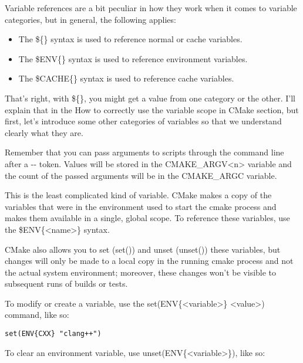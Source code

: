 Variable references are a bit peculiar in how they work when it comes to variable categories, but in general, the following applies:

\begin{itemize}
\item 
The \$\{\} syntax is used to reference normal or cache variables.

\item 
The \$ENV\{\} syntax is used to reference environment variables.

\item 
The \$CACHE\{\} syntax is used to reference cache variables.
\end{itemize}

That's right, with \$\{\}, you might get a value from one category or the other. I'll explain that in the How to correctly use the variable scope in CMake section, but first, let's introduce some other categories of variables so that we understand clearly what they are.

\begin{tcolorbox}[colback=blue!5!white,colframe=blue!75!black,title=Note]
Remember that you can pass arguments to scripts through the command line after a -{}- token. Values will be stored in the CMAKE\_ARGV<n> variable and the count of the passed arguments will be in the CMAKE\_ARGC variable.
\end{tcolorbox}


This is the least complicated kind of variable. CMake makes a copy of the variables that were in the environment used to start the cmake process and makes them available in a single, global scope. To reference these variables, use the \$ENV\{<name>\} syntax.

CMake also allows you to set (set()) and unset (unset()) these variables, but changes will only be made to a local copy in the running cmake process and not the actual system environment; moreover, these changes won't be visible to subsequent runs of builds or tests.

To modify or create a variable, use the set(ENV\{<variable>\} <value>) command, like so:

\begin{lstlisting}[style=styleCMake]
set(ENV{CXX} "clang++")
\end{lstlisting}

To clear an environment variable, use unset(ENV\{<variable>\}), like so:

